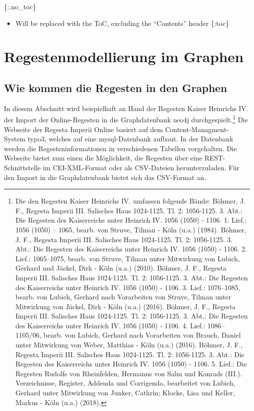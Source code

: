 \documentclass[ngerman,]{scrreprt}
\providecommand{\tightlist}{%
  \setlength{\itemsep}{0pt}\setlength{\parskip}{0pt}}
\begin{document}
\{:.no\_toc\}

\begin{itemize}
\tightlist
\item
  Will be replaced with the ToC, excluding the ``Contents'' header \{:toc\}
\end{itemize}

\chapter{Regestenmodellierung im Graphen}\label{regestenmodellierung-im-graphen}

\section{Wie kommen die Regesten in den Graphen}\label{wie-kommen-die-regesten-in-den-graphen}

In diesem Abschnitt wird beispielhaft an Hand der Regesten Kaiser Heinrichs IV. der Import der Online-Regesten in die Graphdatenbank neo4j durchgespielt.\footnote{Die den Regesten Kaiser Heinrichs IV. umfassen folgende Bände: Böhmer, J. F., Regesta Imperii III. Salisches Haus 1024-1125. Tl. 2: 1056-1125. 3. Abt.: Die Regesten des Kaiserreichs unter Heinrich IV. 1056 (1050) - 1106. 1. Lief.: 1056 (1050) -- 1065, bearb. von Struve, Tilman - Köln (u.a.) (1984). Böhmer, J. F., Regesta Imperii III. Salisches Haus 1024-1125. Tl. 2: 1056-1125. 3. Abt.: Die Regesten des Kaiserreichs unter Heinrich IV. 1056 (1050) - 1106. 2. Lief.: 1065--1075, bearb. von Struve, Tilman unter Mitwirkung von Lubich, Gerhard und Jäckel, Dirk - Köln (u.a.) (2010). Böhmer, J. F., Regesta Imperii III. Salisches Haus 1024-1125. Tl. 2: 1056-1125. 3. Abt.: Die Regesten des Kaiserreichs unter Heinrich IV. 1056 (1050) - 1106. 3. Lief.: 1076--1085, bearb. von Lubich, Gerhard nach Vorarbeiten von Struve, Tilman unter Mitwirkung von Jäckel, Dirk - Köln (u.a.) (2016). Böhmer, J. F., Regesta Imperii III. Salisches Haus 1024-1125. Tl. 2: 1056-1125. 3. Abt.: Die Regesten des Kaiserreichs unter Heinrich IV. 1056 (1050) - 1106. 4. Lief.: 1086--1105/06, bearb. von Lubich, Gerhard nach Vorarbeiten von Brauch, Daniel unter Mitwirkung von Weber, Matthias - Köln (u.a.) (2016). Böhmer, J. F., Regesta Imperii III. Salisches Haus 1024-1125. Tl. 2: 1056-1125. 3. Abt.: Die Regesten des Kaiserreichs unter Heinrich IV. 1056 (1050) - 1106. 5. Lief.: Die Regesten Rudolfs von Rheinfelden, Hermanns von Salm und Konrads (III.). Verzeichnisse, Register, Addenda und Corrigenda, bearbeitet von Lubich, Gerhard unter Mitwirkung von Junker, Cathrin; Klocke, Lisa und Keller, Markus - Köln (u.a.) (2018).} Die Webseite der Regesta Imperii Online basiert auf dem Content-Managment-System typo3, welches auf eine mysql-Datenbank aufbaut. In der Datenbank werden die Regesteninformationen in verschiedenen Tabellen vorgehalten. Die Webseite bietet zum einen die Möglichkeit, die Regesten über eine REST-Schnittstelle im CEI-XML-Format oder als CSV-Dateien herunterzuladen. Für den Import in die Graphdatenbank bietet sich das CSV-Format an.
\end{document}
